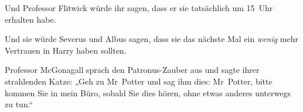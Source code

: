 Und Professor Flitwick würde ihr sagen, dass er sie tatsächlich um 15~Uhr erhalten habe.

Und sie würde Severus und Albus sagen, dass sie das nächste Mal ein \emph{wenig} mehr Vertrauen in Harry haben sollten.

Professor McGonagall sprach den Patronus-Zauber aus und sagte ihrer strahlenden Katze:
„Geh zu Mr~Potter und sag ihm dies: Mr~Potter, bitte kommen Sie in mein Büro, sobald Sie dies hören, ohne etwas anderes unterwegs zu tun.“

